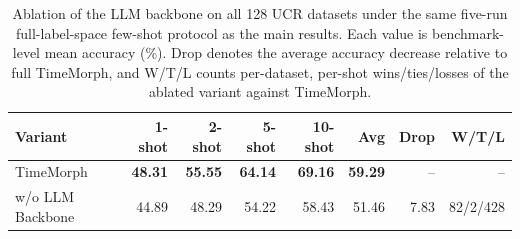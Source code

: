 \begin{table}[t]
\centering
\caption{Ablation of the LLM backbone on all 128 UCR datasets under the same five-run full-label-space few-shot protocol as the main results. Each value is benchmark-level mean accuracy (\%). Drop denotes the average accuracy decrease relative to full TimeMorph, and W/T/L counts per-dataset, per-shot wins/ties/losses of the ablated variant against TimeMorph.}
\label{tab:ablation-llm-backbone}
\begin{tabular}{lrrrrrrr}
\toprule
Variant & 1-shot & 2-shot & 5-shot & 10-shot & Avg & Drop & W/T/L \\
\midrule
TimeMorph & \textbf{48.31} & \textbf{55.55} & \textbf{64.14} & \textbf{69.16} & \textbf{59.29} & -- & -- \\
w/o LLM Backbone & 44.89 & 48.29 & 54.22 & 58.43 & 51.46 & 7.83 & 82/2/428 \\
\bottomrule
\end{tabular}
\end{table}
